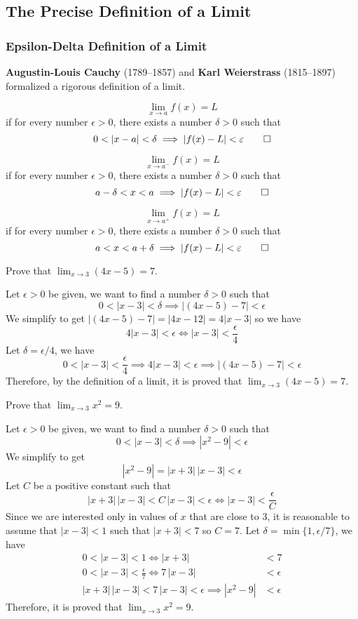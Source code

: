 \subsection{The Precise Definition of a Limit}

\subsubsection{Epsilon-Delta Definition of a Limit}
\textbf{Augustin-Louis Cauchy} (1789--1857) and \textbf{Karl Weierstrass}
(1815--1897) formalized a rigorous definition of a limit.
\begin{definition}
    \[\lim_{x\to a}f(x)=L\] if for every number \(\epsilon>0\), there exists a
    number \(\delta>0\) such that
    \[0<|x-a|<\delta\implies|f(x)-L|<\epsilon\qedhere\]
\end{definition}
\begin{definition}
    \[\lim_{x\to a^-}f(x)=L\] if for every number \(\epsilon>0\), there exists
    a number \(\delta>0\) such that
    \[a-\delta<x<a\implies|f(x)-L|<\epsilon\qedhere\]
\end{definition}
\begin{definition}
    \[\lim_{x\to a^+}f(x)=L\] if for every number \(\epsilon>0\), there exists
    a number \(\delta>0\) such that
    \[a<x<a+\delta\implies|f(x)-L|<\epsilon\qedhere\]
\end{definition}
\begin{problem}
    Prove that \(\lim_{x\to 3}(4x-5)=7\).
\end{problem}
\begin{solution}
    Let \(\epsilon>0\) be given, we want to find a number \(\delta>0\) such
    that
    \[0<|x-3|<\delta \implies|(4x-5)-7|<\epsilon\]
    We simplify to get \(|(4x-5)-7|=|4x-12|=4|x-3|\) so we have
    \[4|x-3|<\epsilon\iff|x-3|<\frac{\epsilon}{4}\]
    Let \(\delta=\epsilon/4\), we have
    \[0<|x-3|<\frac{\epsilon}{4}\implies4|x-3|<\epsilon\implies
    |(4x-5)-7|<\epsilon\]
    Therefore, by the definition of a limit, it is proved that
    \(\lim_{x\to 3}(4x-5)=7\).
\end{solution}
\begin{problem}
    Prove that \(\lim_{x\to 3}x^2=9\).
\end{problem}
\begin{solution}
    Let \(\epsilon>0\) be given, we want to find a number \(\delta>0\) such
    that
    \[0<|x-3|<\delta\implies|x^2-9|<\epsilon\]
    We simplify to get \[|x^2-9|=|x+3|\,|x-3|<\epsilon\]
    Let \(C\) be a positive constant such that
    \[|x+3|\,|x-3|<C\,|x-3|<\epsilon \iff |x-3|<\frac{\epsilon}{C}\]
    Since we are interested only in values of \(x\) that are close to 3, it is
    reasonable to assume that \(|x-3|<1\) such that \(|x+3|<7\) so \(C=7\).
    Let \(\delta=\min\{1,\epsilon/7\}\), we have
    \begin{align*}
        0<|x-3|<1 \iff |x+3| &< 7 \\
        0<|x-3|<\frac{\epsilon}{7} \iff 7\,|x-3| &< \epsilon \\
        |x+3|\,|x-3|<7\,|x-3|<\epsilon\implies|x^2-9| &< \epsilon
    \end{align*}
    Therefore, it is proved that \(\lim_{x\to 3}x^2=9\).
\end{solution}
